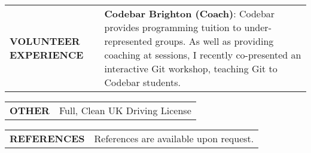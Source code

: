 \documentclass[7pt]{article}
\begin{document}
\begin{tabular}{@{} p{} p{}}
  \textbf{VOLUNTEER EXPERIENCE} & \textbf{Codebar Brighton (Coach)}: Codebar provides programming tuition to under-represented groups. As well as providing coaching at sessions, I recently co-presented an interactive Git workshop, teaching Git to Codebar students. \\
\end{tabular}

\vspace{0.25in}

\begin{tabular}{@{} p{} p{}}
  \textbf{OTHER} & Full, Clean UK Driving License
\end{tabular}

\vspace{0.25in}

\begin{tabular}{@{} p{} p{}}
  \textbf{REFERENCES} & References are available upon request.
\end{tabular}

\bigskip
\end{document}
